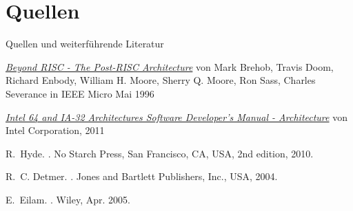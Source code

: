 \section{Quellen}

\begin{frame}{Quellen und weiterführende Literatur}
\begin{thebibliography}{9}

    \href{http://www.cse.msu.edu/~enbody/postrisc/postrisc2.htm}{\emph{Beyond RISC - The Post-RISC Architecture}}
    von Mark Brehob, Travis Doom, Richard Enbody, William H. Moore, Sherry Q. Moore, Ron Sass, Charles Severance
    in IEEE Micro Mai 1996

    \href{http://www.intel.com/Assets/PDF/manual/253665.pdf}{
    \emph{Intel 64 and IA-32 Architectures Software Developer's Manual - Architecture}}
    von Intel Corporation,
    2011

R.~Hyde.
.
\newblock No Starch Press, San Francisco, CA, USA, 2nd edition, 2010.

    R.~C. Detmer.
    .
    \newblock Jones and Bartlett Publishers, Inc., USA, 2004.

    E.~Eilam.
    .
    \newblock Wiley, Apr. 2005.

\end{thebibliography}
\end{frame}
